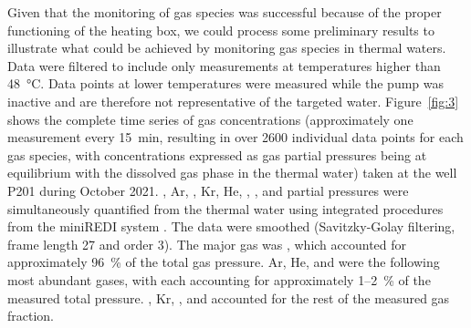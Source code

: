 Given that the monitoring of gas species was successful because of the proper functioning of the heating box, we could process some preliminary results to illustrate what could be achieved by monitoring gas species in thermal waters. 
Data were filtered to include only measurements at temperatures higher than \SI{48}{\celsius}.
Data points at lower temperatures were measured while the pump was inactive and are therefore not representative of the targeted water.
Figure~\ref{fig:3} shows the complete time series of gas concentrations (approximately one measurement every \SI{15}{\minute}, resulting in over \SI{2600}{} individual data points for each gas species, with concentrations expressed as gas partial pressures being at equilibrium with the dissolved gas phase in the thermal water) taken at the well P201 during October 2021.
, Ar, , Kr, He, , , and  partial pressures were simultaneously quantified from the thermal water using integrated procedures from the miniREDI system \citep{brennwald2016portable}.
The data were smoothed (Savitzky-Golay filtering, frame length 27 and order 3).
The major gas was , which accounted for approximately \SI{96}{\percent} of the total gas pressure.
Ar, He, and  were the following most abundant gases, with each accounting for approximately 1--\SI{2}{\percent} of the measured total pressure. 
, Kr, , and  accounted for the rest of the measured gas fraction. 

\FloatBarrier %

